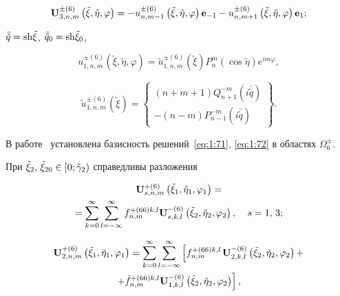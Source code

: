 \begin{russian}
\begin{equation}\label{eq:1:75}
{\bf{U}}_{3,n,m}^{ \pm (6)}\left( {\tilde \xi ,\tilde \eta ,\varphi } \right) =  - u_{n,m - 1}^{ \pm (6)}\left( {\tilde \xi ,\tilde \eta ,\varphi } \right){{\bf{e}}_{ - 1}} - u_{n,m + 1}^{ \pm (6)}\left( {\tilde \xi ,\tilde \eta ,\varphi } \right){{\bf{e}}_1};
\end{equation}

\noindent $\bar{\tilde q} = {\mathop{\rm sh}\nolimits} \tilde\xi $, ${\bar{\tilde q}_0} = {\mathop{\rm sh}\nolimits} {\tilde \xi _0}$,

\begin{equation}\label{eq:1:76}
u_{1,n,m}^{ \pm (6)}\left( {\tilde \xi ,\tilde \eta ,\varphi } \right) = \tilde u_{1,n,m}^{ \pm (6)}(\tilde \xi )P_n^m(\cos \tilde \eta ){e^{im\varphi }},
\end{equation}

\begin{equation}\label{eq:1:77}
\tilde u_{1,n,m}^{ \pm (6)}(\tilde \xi ) = \left\{ \begin{array}{l}
(n + m + 1)Q_{n + 1}^{ - m}(i\bar \tilde q)\\
 - (n - m)P_{n - 1}^{ - m}(i\bar \tilde q)
\end{array} \right\}.
\end{equation}

В работе~\cite{Nikolaev1998} установлена базисность решений~\eqref{eq:1:71}, \eqref{eq:1:72} в областях $\Omega _6^ \pm $.

\begin{theorem}
При ${\tilde \xi _2},{\mkern 1mu} {\kern 1pt} {\tilde \xi _{20}} \in \left[ {0;{{\tilde \gamma }_2}} \right)$ справедливы разложения

\begin{multline}\label{eq:1:78}
{\bf{U}}_{s,n,m}^{ + (6)}\left( {{{\tilde \xi }_1},{{\tilde \eta }_1},{\varphi _1}} \right) = \\
= \sum\limits_{k = 0}^\infty  {\sum\limits_{l =  - \infty }^\infty  {f_{n,m}^{ + (66)k,l}} } {\bf{U}}_{s,k,l}^{ - (6)}\left( {{{\tilde \xi }_2},{{\tilde \eta }_2},{\varphi _2}} \right), \quad {\kern 1pt} s = 1,{\mkern 1mu} {\kern 1pt} 3;
\end{multline}

\begin{multline}\label{eq:1:79}
{\bf{U}}_{2,n,m}^{ + (6)}\left( {{{\tilde \xi }_1},{{\tilde \eta }_1},{\varphi _1}} \right) = \sum\limits_{k = 0}^\infty  {\sum\limits_{l =  - \infty }^\infty  {\left[ {f_{n,m}^{ + (66)k,l}} \right.} } {\bf{U}}_{2,k,l}^{ - (6)}\left( {{{\tilde \xi }_2},{{\tilde \eta }_2},{\varphi _2}} \right) + \\
\left. { + \tilde f_{n,m}^{ + (66)k,l}{\bf{U}}_{1,k,l}^{ - (6)}\left( {{{\tilde \xi }_2},{{\tilde \eta }_2},{\varphi _2}} \right)} \right],
\end{multline}


\end{theorem}
\end{russian}
